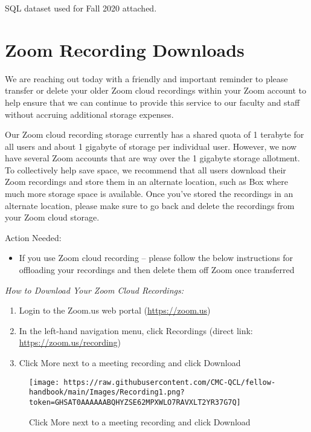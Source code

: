 \documentclass[
]{book}
\providecommand{\tightlist}{%
  \setlength{\itemsep}{0pt}\setlength{\parskip}{0pt}}
\begin{document}
SQL dataset used for Fall 2020 attached.

\hypertarget{zoom-recording-downloads}{%
\section{Zoom Recording Downloads}\label{zoom-recording-downloads}}

We are reaching out today with a friendly and important reminder to please transfer or delete your older Zoom cloud recordings within your Zoom account to help ensure that we can continue to provide this service to our faculty and staff without accruing additional storage expenses.

Our Zoom cloud recording storage currently has a shared quota of 1 terabyte for all users and about 1 gigabyte of storage per individual user. However, we now have several Zoom accounts that are way over the 1 gigabyte storage allotment. To collectively help save space, we recommend that all users download their Zoom recordings and store them in an alternate location, such as Box where much more storage space is available. Once you've stored the recordings in an alternate location, please make sure to go back and delete the recordings from your Zoom cloud storage.

Action Needed:

\begin{itemize}
\tightlist
\item
  If you use Zoom cloud recording -- please follow the below instructions for offloading your recordings and then delete them off Zoom once transferred
\end{itemize}

\emph{How to Download Your Zoom Cloud Recordings:}

\begin{enumerate}
\def\labelenumi{\arabic{enumi}.}
\item
  Login to the Zoom.us web portal (\url{https://zoom.us})
\item
  In the left-hand navigation menu, click Recordings (direct link: \url{https://zoom.us/recording})
\item
  Click More next to a meeting recording and click Download
\end{enumerate}

\begin{figure}
\centering
\texttt{[image: https://raw.githubusercontent.com/CMC-QCL/fellow-handbook/main/Images/Recording1.png?token=GHSAT0AAAAAABQHYZSE62MPXWLO7RAVXLT2YR37G7Q]}
\caption{Click More next to a meeting recording and click Download}
\end{figure}
\end{document}
